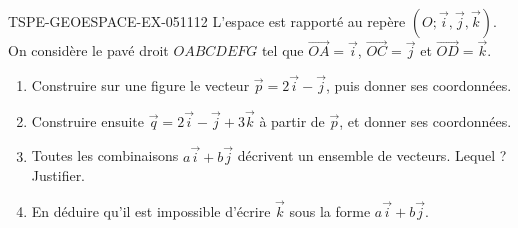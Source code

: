 \begin{exercice}{TSPE-GEOESPACE-EX-051}{1}{12}
L'espace est rapporté au repère $(O;\vec{i},\vec{j},\vec{k})$. On considère
le pavé droit $OABCDEFG$ tel que $\vec{OA}=\vec{i}$, $\vec{OC}=\vec{j}$ et
$\vec{OD}=\vec{k}$.
\begin{enumerate}
  \item Construire sur une figure le vecteur $\vec{p}=2\vec{i}-\vec{j}$, puis
        donner ses coordonnées.
  \item Construire ensuite $\vec{q}=2\vec{i}-\vec{j}+3\vec{k}$ à partir de
        $\vec{p}$, et donner ses coordonnées.
  \item Toutes les combinaisons $a\vec{i}+b\vec{j}$ décrivent un ensemble de
        vecteurs. Lequel ? Justifier.
  \item En déduire qu'il est impossible d'écrire $\vec{k}$ sous la forme
        $a\vec{i}+b\vec{j}$.
\end{enumerate}
\end{exercice}

